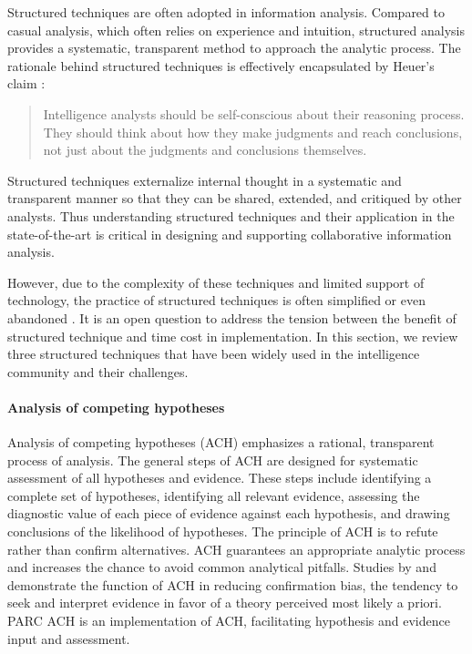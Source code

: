 Structured techniques are often adopted in information analysis. Compared to casual analysis, which often relies on experience and intuition, structured analysis provides a systematic, transparent method to approach the analytic process. The rationale behind structured techniques is effectively encapsulated by Heuer's claim \cite[p.31]{Heuer1999}: 

\begin{quote}
	Intelligence analysts should be self-conscious about their reasoning process. They should think about how they make judgments and reach conclusions, not just about the judgments and conclusions themselves.
\end{quote}

Structured techniques externalize internal thought in a systematic and transparent manner so that they can be shared, extended, and critiqued by other analysts. Thus understanding structured techniques and their application in the state-of-the-art is critical in designing and supporting collaborative information analysis. 

However, due to the complexity of these techniques and limited support of technology, the practice of structured techniques is often simplified or even abandoned \citep{Chin2009, Wright2006}. It is an open question to address the tension between the benefit of structured technique and time cost in implementation. In this section, we review three structured techniques that have been widely used in the intelligence community and their challenges.

\paragraph{Analysis of competing hypotheses}
Analysis of competing hypotheses (ACH) \citep{Heuer1999} emphasizes a rational, transparent process of analysis. The general steps of ACH are designed for systematic assessment of all hypotheses and evidence. These steps include identifying a complete set of hypotheses, identifying all relevant evidence, assessing the diagnostic value of each piece of evidence against each hypothesis, and drawing conclusions of the likelihood of hypotheses. The principle of ACH is to refute rather than confirm alternatives. ACH guarantees an appropriate analytic process and increases the chance to avoid common analytical pitfalls. Studies by \cite{Lehner2008} and \cite{Lord1979} demonstrate the function of ACH in reducing confirmation bias, the tendency to seek and interpret evidence in favor of a theory perceived most likely a priori. PARC ACH \citep{PARC} is an implementation of ACH, facilitating hypothesis and evidence input and assessment. 

